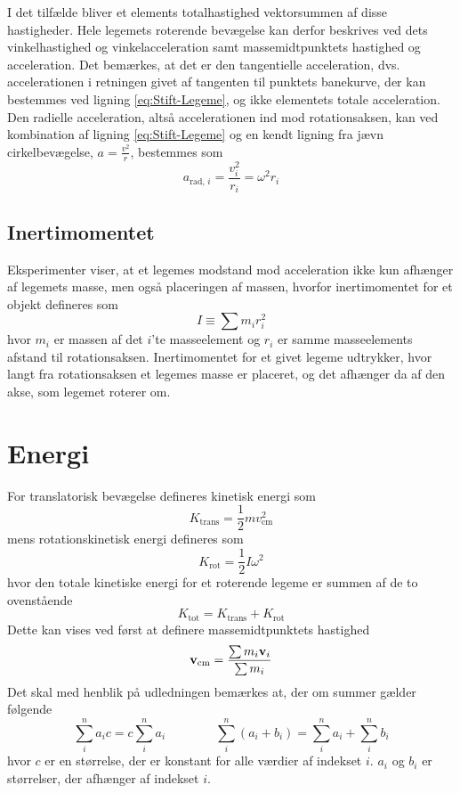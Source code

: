 I det tilfælde bliver et elements totalhastighed vektorsummen af disse hastigheder. Hele legemets roterende bevægelse kan derfor beskrives ved dets vinkelhastighed og vinkelacceleration samt massemidtpunktets hastighed og acceleration. Det bemærkes, at det er den tangentielle acceleration, dvs. accelerationen i retningen givet af tangenten til punktets banekurve, der kan bestemmes ved ligning \ref{eq:Stift-Legeme}, og ikke elementets totale acceleration. Den radielle acceleration, altså accelerationen ind mod rotationsaksen, kan ved kombination af ligning \ref{eq:Stift-Legeme} og en kendt ligning fra jævn cirkelbevægelse, $a=\frac{v^2}{r}$, bestemmes som 
\begin{equation}
     a_{\text{rad},\,i} = \frac{v_i^2}{r_i} = \omega^2r_i
\end{equation}

\subsection{Inertimomentet}
Eksperimenter viser, at et legemes modstand mod acceleration ikke kun afhænger af legemets masse, men også placeringen af massen, hvorfor inertimomentet for et objekt defineres som
\begin{equation} \label{eq:Inertimoment}
    I \equiv \sum m_ir_i^2
\end{equation}
hvor $m_i$ er massen af det $i$'te masseelement og $r_i$ er samme masseelements afstand til rotationsaksen. Inertimomentet for et givet legeme udtrykker, hvor langt fra rotationsaksen et legemes masse er placeret, og det afhænger da af den akse, som legemet  roterer om.

\section{Energi}
For translatorisk bevægelse defineres kinetisk energi som
\begin{equation} \label{eq:Ktrans}
    K_{\text{trans}}=\frac{1}{2}mv_\text{cm}^2
\end{equation}
mens rotationskinetisk energi defineres som
\begin{equation} \label{eq:Krot}
    K_{\text{rot}}=\frac{1}{2}I\omega^2
\end{equation}
hvor den totale kinetiske energi for et roterende legeme er summen af de to ovenstående
\begin{equation} \label{eq:K}
    K_{\text{tot}}=K_{\text{trans}}+K_{\text{rot}}
\end{equation}
Dette kan vises ved først at definere massemidtpunktets hastighed
\begin{equation} \label{eq:v_cm}
    \mathbf{v}_\text{cm}=\frac{\sum m_i\mathbf{v}_i}{\sum m_i}
\end{equation}
Det skal med henblik på udledningen bemærkes at, der om summer gælder følgende
\begin{equation}
    \sum_i^n a_ic=c\sum_i^n a_i \qquad\qquad \sum_i^n\left(a_i + b_i\right) = \sum_i^n a_i + \sum_i^n b_i
\end{equation}
hvor $c$ er en størrelse, der er konstant for alle værdier af indekset $i$. $a_i$ og $b_i$ er størrelser, der afhænger af indekset $i$. \\

